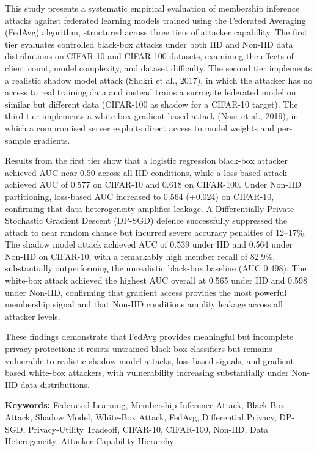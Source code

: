 \documentclass[12pt, a4paper]{report}
\begin{document}
This study presents a systematic empirical evaluation of membership inference
attacks against federated learning models trained using the Federated Averaging
(FedAvg) algorithm, structured across three tiers of attacker capability. The
first tier evaluates controlled black-box attacks under both IID and Non-IID data
distributions on CIFAR-10 and CIFAR-100 datasets, examining the effects of client
count, model complexity, and dataset difficulty. The second tier implements a
realistic shadow model attack (Shokri et al., 2017), in which the attacker has
no access to real training data and instead trains a surrogate federated model on
similar but different data (CIFAR-100 as shadow for a CIFAR-10 target). The third
tier implements a white-box gradient-based attack (Nasr et al., 2019), in which a
compromised server exploits direct access to model weights and per-sample
gradients.

Results from the first tier show that a logistic regression black-box attacker
achieved AUC near 0.50 across all IID conditions, while a loss-based attack
achieved AUC of 0.577 on CIFAR-10 and 0.618 on CIFAR-100. Under Non-IID
partitioning, loss-based AUC increased to 0.564 (+0.024) on CIFAR-10, confirming
that data heterogeneity amplifies leakage. A Differentially Private Stochastic
Gradient Descent (DP-SGD) defence successfully suppressed the attack to near
random chance but incurred severe accuracy penalties of 12--17\%. The shadow model
attack achieved AUC of 0.539 under IID and 0.564 under Non-IID on CIFAR-10,
with a remarkably high member recall of 82.9\%, substantially outperforming the
unrealistic black-box baseline (AUC 0.498). The white-box attack achieved the
highest AUC overall at 0.565 under IID and 0.598 under Non-IID, confirming that
gradient access provides the most powerful membership signal and that Non-IID
conditions amplify leakage across all attacker levels.

These findings demonstrate that FedAvg provides meaningful but incomplete privacy
protection: it resists untrained black-box classifiers but remains vulnerable to
realistic shadow model attacks, loss-based signals, and gradient-based white-box
attackers, with vulnerability increasing substantially under Non-IID data
distributions.

\vspace{0.5cm}
\noindent\textbf{Keywords:} Federated Learning, Membership Inference Attack,
Black-Box Attack, Shadow Model, White-Box Attack, FedAvg, Differential Privacy,
DP-SGD, Privacy-Utility Tradeoff, CIFAR-10, CIFAR-100, Non-IID, Data Heterogeneity,
Attacker Capability Hierarchy
\end{document}
